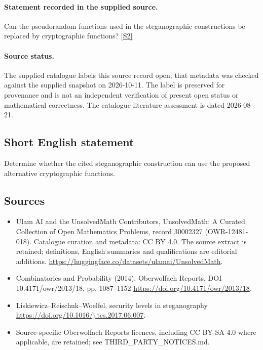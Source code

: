 \documentclass[11pt]{article}
\begin{document}
\paragraph{Statement recorded in the supplied source.}
Can the pseudorandom functions used in the steganographic constructions be replaced by cryptographic functions? \href{https://doi.org/10.4171/owr/2013/18}{[S2]}
\paragraph{Source status.}
The supplied catalogue labels this source record open; that metadata was checked against the supplied snapshot on 2026-10-11. The label is preserved for provenance and is not an independent verification of present open status or mathematical correctness. The catalogue literature assessment is dated 2026-08-21.
\subsection{Short English statement}
Determine whether the cited steganographic construction can use the proposed alternative cryptographic functions.
\subsection{Sources}
\begin{itemize}
\item[S1] Ulam AI and the UnsolvedMath Contributors, UnsolvedMath: A Curated Collection of Open Mathematics Problems, record 30002327 (OWR-12481-018). Catalogue curation and metadata: CC BY 4.0. The source extract is retained; definitions, English summaries and qualifications are editorial additions.
\url{https://huggingface.co/datasets/ulamai/UnsolvedMath}.
\item[S2] Combinatorics and Probability (2014), Oberwolfach Reports, DOI 10.4171/owr/2013/18, pp. 1087--1152
\url{https://doi.org/10.4171/owr/2013/18}.
\item[S3] Liskiewicz--Reischuk--Woelfel, security levels in steganography
\url{https://doi.org/10.1016/j.tcs.2017.06.007}.
\item Source-specific Oberwolfach Reports licences, including CC BY-SA 4.0 where applicable, are retained; see THIRD\_PARTY\_NOTICES.md.
\end{itemize}
\end{document}
